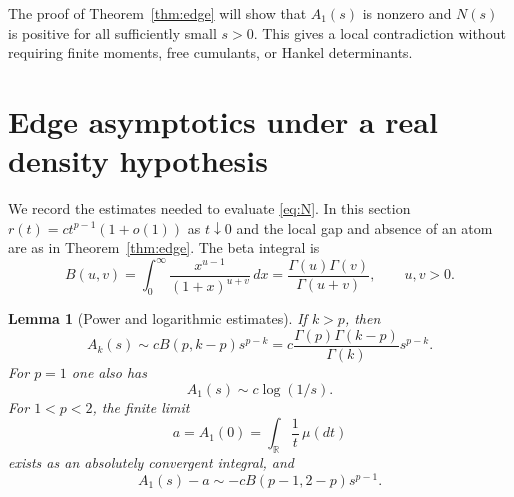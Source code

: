 \documentclass[11pt,a4paper]{article}
\newtheorem{lemma}[theorem]{Lemma}
\theoremstyle{definition}
\theoremstyle{remark}
\newcommand{\R}{\mathbb R}
\begin{document}
The proof of Theorem~\ref{thm:edge} will show that $A_1(s)$ is
nonzero and $N(s)$ is positive for all sufficiently small $s>0$.
This gives a local contradiction without requiring finite moments,
free cumulants, or Hankel determinants.

\section{Edge asymptotics under a real density hypothesis}

We record the estimates needed to evaluate \eqref{eq:N}. In this
section $r(t)=ct^{p-1}(1+o(1))$ as $t\downarrow0$ and the local
gap and absence of an atom are as in Theorem~\ref{thm:edge}.
The beta integral is
\[
 B(u,v)=\int_0^\infty\frac{x^{u-1}}{(1+x)^{u+v}}\,dx
       =\frac{\Gamma(u)\Gamma(v)}{\Gamma(u+v)},\qquad u,v>0.
\]

\begin{lemma}[Power and logarithmic estimates]\label{lem:asymptotics}
If $k>p$, then
\begin{equation}\label{eq:Ak-asymptotic}
 A_k(s)\sim cB(p,k-p)s^{p-k}
 =c\frac{\Gamma(p)\Gamma(k-p)}{\Gamma(k)}s^{p-k}.
\end{equation}
For $p=1$ one also has
\begin{equation}\label{eq:A1-log}
 A_1(s)\sim c\log(1/s).
\end{equation}
For $1<p<2$, the finite limit
\begin{equation}\label{eq:a}
 a=A_1(0)=\int_\R\frac1t\,\mu(dt)
\end{equation}
exists as an absolutely convergent integral, and
\begin{equation}\label{eq:A1-difference}
 A_1(s)-a
 \sim-cB(p-1,2-p)s^{p-1}.
\end{equation}
\end{lemma}
\end{document}
